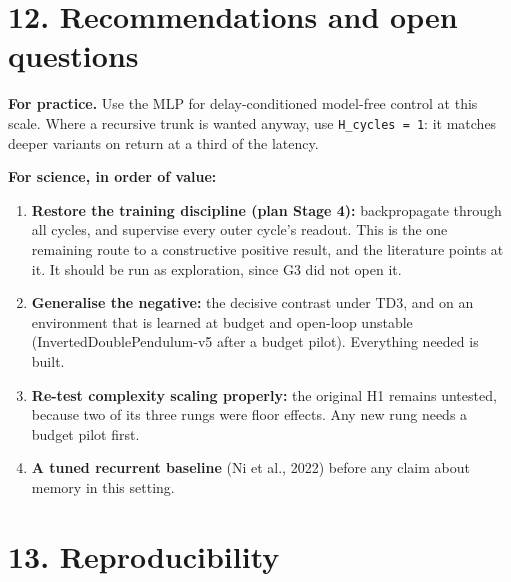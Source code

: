 \documentclass[11pt]{article}
\begin{document}
\medskip



\section*{12. Recommendations and open questions}



\textbf{For practice.} Use the MLP for delay-conditioned model-free control at this scale. Where a recursive trunk is wanted anyway, use \texttt{H\_cycles = 1}: it matches deeper variants on return at a third of the latency.



\textbf{For science, in order of value:}

\begin{enumerate}
\item \textbf{Restore the training discipline (plan Stage 4):} backpropagate through all cycles, and supervise every outer cycle's readout. This is the one remaining route to a constructive positive result, and the literature points at it. It should be run as exploration, since G3 did not open it.
\item \textbf{Generalise the negative:} the decisive contrast under TD3, and on an environment that is learned at budget and open-loop unstable (InvertedDoublePendulum-v5 after a budget pilot). Everything needed is built.
\item \textbf{Re-test complexity scaling properly:} the original H1 remains untested, because two of its three rungs were floor effects. Any new rung needs a budget pilot first.
\item \textbf{A tuned recurrent baseline} (Ni et al., 2022) before any claim about memory in this setting.
\end{enumerate}



\medskip



\section*{13. Reproducibility}
\end{document}
